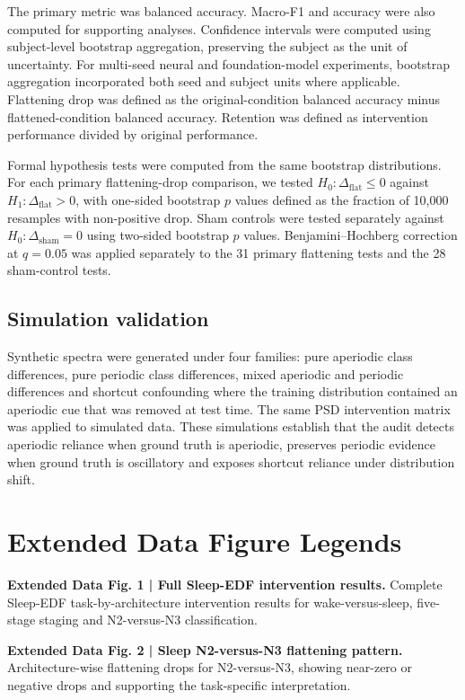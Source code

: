 \documentclass[pdflatex,sn-nature]{sn-jnl}
\begin{document}
The primary metric was balanced accuracy. Macro-F1 and accuracy were also computed for supporting analyses. Confidence intervals were computed using subject-level bootstrap aggregation, preserving the subject as the unit of uncertainty. For multi-seed neural and foundation-model experiments, bootstrap aggregation incorporated both seed and subject units where applicable. Flattening drop was defined as the original-condition balanced accuracy minus flattened-condition balanced accuracy. Retention was defined as intervention performance divided by original performance.

Formal hypothesis tests were computed from the same bootstrap distributions. For each primary flattening-drop comparison, we tested $H_0:\Delta_{\mathrm{flat}}\leq 0$ against $H_1:\Delta_{\mathrm{flat}}>0$, with one-sided bootstrap $p$ values defined as the fraction of 10,000 resamples with non-positive drop. Sham controls were tested separately against $H_0:\Delta_{\mathrm{sham}}=0$ using two-sided bootstrap $p$ values. Benjamini--Hochberg correction at $q=0.05$ was applied separately to the 31 primary flattening tests and the 28 sham-control tests.

\subsection{Simulation validation}

Synthetic spectra were generated under four families: pure aperiodic class differences, pure periodic class differences, mixed aperiodic and periodic differences and shortcut confounding where the training distribution contained an aperiodic cue that was removed at test time. The same PSD intervention matrix was applied to simulated data. These simulations establish that the audit detects aperiodic reliance when ground truth is aperiodic, preserves periodic evidence when ground truth is oscillatory and exposes shortcut reliance under distribution shift.

\section*{Extended Data Figure Legends}

\textbf{Extended Data Fig. 1 | Full Sleep-EDF intervention results.} Complete Sleep-EDF task-by-architecture intervention results for wake-versus-sleep, five-stage staging and N2-versus-N3 classification.

\textbf{Extended Data Fig. 2 | Sleep N2-versus-N3 flattening pattern.} Architecture-wise flattening drops for N2-versus-N3, showing near-zero or negative drops and supporting the task-specific interpretation.
\end{document}
